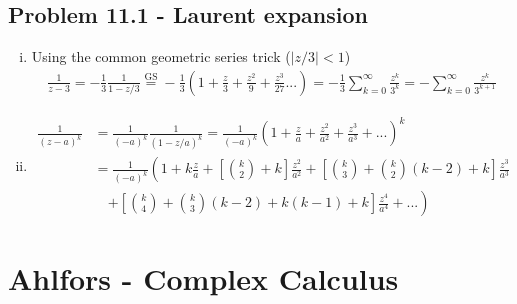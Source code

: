 \documentclass[10pt,a4paper]{book}
\theoremstyle{definition}
\begin{document}
\subsection{Problem 11.1 - Laurent expansion}
\begin{enumerate}[(i)]
\item Using the common geometric series trick ($|z/3|<1$)
\begin{align}
\frac{1}{z-3}=-\frac{1}{3}\frac{1}{1-z/3}
\overset{\text{GS}}{=}-\frac{1}{3}\left(1+\frac{z}{3}+\frac{z^2}{9}+\frac{z^3}{27}...\right)
=-\frac{1}{3}\sum_{k=0}^\infty\frac{z^k}{3^k}
=-\sum_{k=0}^\infty\frac{z^k}{3^{k+1}}
\end{align}

\item
\begin{align}
\frac{1}{(z-a)^k}
&=\frac{1}{(-a)^k}\frac{1}{(1-z/a)^k}
=\frac{1}{(-a)^k}\left(1+\frac{z}{a}+\frac{z^2}{a^2}+\frac{z^3}{a^3}+...\right)^k\\
&=\frac{1}{(-a)^k}\left(
1+k\frac{z}{a}
+\left[\binom{k}{2}+k\right]\frac{z^2}{a^2}
+\left[\binom{k}{3}+\binom{k}{2}(k-2)+k\right]\frac{z^3}{a^3}\right.\\
&\quad\left.
+\left[\binom{k}{4}+\binom{k}{3}(k-2)+k(k-1)+k\right]\frac{z^4}{a^4}
+...\right)
\end{align}
\end{enumerate}


\section{{\sc Ahlfors} - Complex Calculus}
\end{document}
